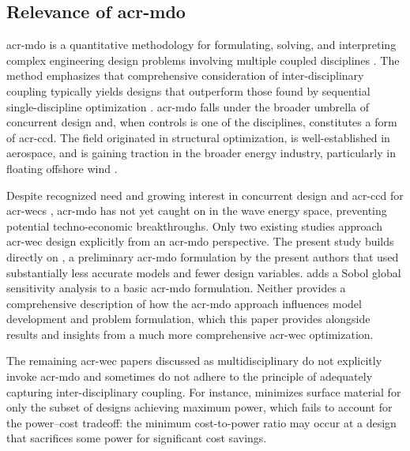 \subsection{Relevance of \gls{acr-mdo}}
\ifdefined\DISSERTATION
    \gls{acr-mdo} is a quantitative methodology for formulating, solving, and interpreting complex engineering design problems involving multiple coupled disciplines \citep{agte_mdo_2010}.
    The method emphasizes that comprehensive consideration of inter-disciplinary coupling typically yields designs that outperform those found by sequential single-discipline optimization \citep{martins_multidisciplinary_2013}.
    \gls{acr-mdo} falls under the broader umbrella of concurrent design and, when controls is one of the disciplines, constitutes a form of \gls{acr-ccd}.
    The field originated in structural optimization, is well-established in aerospace, and is gaining traction in the broader energy industry, particularly in floating offshore wind \citep{abbas_control_2024,jasa_effectively_2022,patryniak_multidisciplinary_2022}.

    Despite recognized need and growing interest in concurrent design and \gls{acr-ccd} for \glspl{acr-wec} \citep{mi_multi-scale_2025,ringwood_empowering_2023}, \gls{acr-mdo} has not yet caught on in the wave energy space, preventing potential techno-economic breakthroughs.
    Only two existing studies \citep{mccabe_multidisciplinary_2022,khanal_multi-objective_2024} approach \gls{acr-wec} design explicitly from an \gls{acr-mdo} perspective.
    The present study builds directly on \citet{mccabe_multidisciplinary_2022}, a preliminary \gls{acr-mdo} formulation by the present authors that used substantially less accurate models and fewer design variables.
    \citet{khanal_multi-objective_2024} adds a Sobol global sensitivity analysis to a basic \gls{acr-mdo} formulation.
    Neither provides a comprehensive description of how the \gls{acr-mdo} approach influences model development and problem formulation, which this paper provides alongside results and insights from a much more comprehensive \gls{acr-wec} optimization.

    The remaining \gls{acr-wec} papers discussed as multidisciplinary do not explicitly invoke \gls{acr-mdo} and sometimes do not adhere to the principle of adequately capturing inter-disciplinary coupling.
    For instance, \citet{edwards_optimisation_2022} minimizes surface material for only the subset of designs achieving maximum power, which fails to account for the power--cost tradeoff: the minimum cost-to-power ratio may occur at a design that sacrifices some power for significant cost savings.

